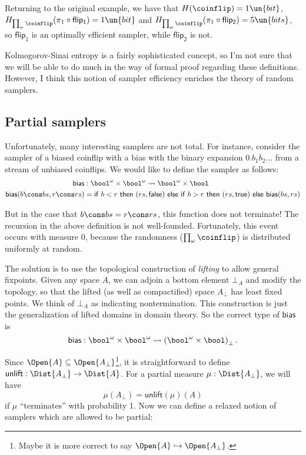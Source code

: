 Returning to the original example, we have that $H(\coinflip) = 1\un{bit}$, $H_{\prod_\omega \coinflip}(\pi_1 \circ \mathsf{flip_1}) = 1 \un{bit}$ and $H_{\prod_\omega \coinflip}(\pi_1 \circ \mathsf{flip_2}) = 5 \un{bits}$, so $\mathsf{flip_1}$ is an optimally efficient sampler, while $\mathsf{flip_2}$ is not.

Kolmogorov-Sinai entropy is a fairly sophisticated concept, so I'm not sure that we will be able to do much in the way of formal proof regarding these definitions. However, I think this notion of sampler efficiency enriches the theory of random samplers.

\subsection{Partial samplers}

Unfortunately, many interesting samplers are not total. For instance, consider the sampler of a biased coinflip with a bias with the binary expansion $0.b_1 b_2 \ldots$ from a stream of unbiased coinflips. We would like to define the sampler as follows:
\begin{align*}
\mathsf{bias} &: \bool^\omega \times \bool^\omega \leadsto \bool^\omega \times \bool
\\ \mathsf{bias}(b \cons bs, r \cons rs) &= \mathsf{if}\ b < r\ \mathsf{then}\ (rs, \mathsf{false})
  \ \mathsf{else}\ \mathsf{if}\ b > r\ \mathsf{then}\ (rs, \mathsf{true})\ \mathsf{else}\ \mathsf{bias}(bs, rs)
\end{align*}

But in the case that $b \cons bs = r \cons rs$, this function does not terminate! The recursion in the above definition is not well-founded. Fortunately, this event occurs with measure 0, because the randomness ($\prod_\omega \coinflip$) is distributed uniformly at random.

The solution is to use the topological construction of \emph{lifting} to allow general fixpoints. Given any space $A$, we can adjoin a bottom element $\bot_A$ and modify the topology, so that the lifted (as well as compactified) space $A_\bot$ has least fixed points. We think of $\bot_A$ as indicating nontermination. This construction is just the generalization of lifted domains in domain theory. So the correct type of $\mathsf{bias}$ is
\[
\mathsf{bias} : \bool^\omega \times \bool^\omega \leadsto \left( \bool^\omega \times \bool \right)_\bot.
\]

Since $\Open{A} \subseteq \Open{A_\bot}$\footnote{Maybe it is more correct to say $\Open{A} \hookrightarrow \Open{A_\bot}$.}, it is straightforward to define $\mathsf{unlift} : \Dist{A_\bot} \to \Dist{A}$. For a partial measure $\mu : \Dist{A_\bot}$, we will have
\[
\mu(A_\bot) = \mathsf{unlift}(\mu)(A)
\]
if $\mu$ ``terminates'' with probability 1. Now we can define a relaxed notion of samplers which are allowed to be partial:

